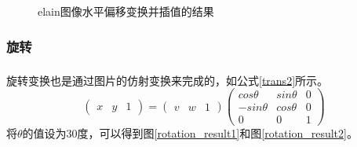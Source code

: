 \documentclass[UTF8]{ctexart}
\newcommand{\upcite}[1]{\textsuperscript{\textsuperscript{\cite{#1}}}}
\begin{document}
\begin{figure}[h!]
	\centering
	\hspace{0.1in} 
	\hspace{0.1in} 
	\caption{elain图像水平偏移变换并插值的结果} 
	\label{shear_result2} %
\end{figure}

\subsubsection{旋转}

旋转变换也是通过图片的仿射变换来完成的，如公式\ref{trans2}所示\upcite{dip}。
\begin{equation}\label{trans2}
	\left( \begin{array}{ccc}
		x & y & 1
		\end{array} \right)
		=
	\left( \begin{array}{ccc}
		v & w & 1
		\end{array} \right) 
	\left( \begin{array}{ccc}
		cos\theta  & sin\theta  & 0  \\
		-sin\theta  & cos\theta & 0 \\
		0 & 0 & 1 
		\end{array} \right)
\end{equation}
将$\theta$的值设为30度，可以得到图\ref{rotation_result1}和图\ref{rotation_result2}。
\end{document}
